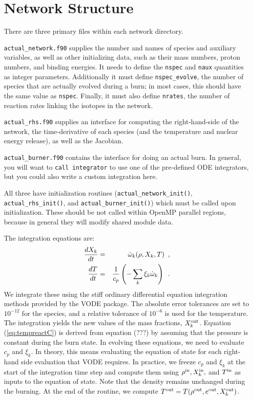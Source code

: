 \section{Network Structure}

There are three primary files within each network directory.

{\tt actual\_network.f90} supplies the number and names of species and
auxiliary variables, as well as other initializing data, such as their
mass numbers, proton numbers, and binding energies. It needs to define
the {\tt nspec} and {\tt naux} quantities as integer parameters. Additionally
it must define {\tt nspec\_evolve}, the number of species that are actually evolved
during a burn; in most cases, this should have the same value as {\tt nspec}.
Finally, it must also define {\tt nrates}, the number of reaction rates
linking the isotopes in the network.

{\tt actual\_rhs.f90} supplies an interface for computing the right-hand-side
of the network, the time-derivative of each species (and the temperature and
nuclear energy release), as well as the Jacobian.

{\tt actual\_burner.f90} contains the interface for doing an actual burn.
In general, you will want to {\tt call integrator} to use one of the pre-defined
ODE integrators, but you could also write a custom integration here.

All three have initialization routines ({\tt actual\_network\_init()},
{\tt actual\_rhs\_init()}, and {\tt actual\_burner\_init()}) which must
be called upon initialization. These should be not called within
OpenMP parallel regions, because in general they will modify shared module data.

The integration equations are:
\begin{eqnarray}
\frac{dX_k}{dt} &=& \dot{\omega}_k(\rho,X_k,T)\enskip, \label{eq:VODE1C} \\
\frac{dT}{dt} &=&\frac{1}{c_p} \left ( -\sum_k \xi_k  \dot{\omega}_k  \right )\enskip. \label{eq:tempreactC}
\end{eqnarray}
We integrate these using the stiff ordinary differential equation
integration methods provided by the VODE package.  The absolute error
tolerances are set to $10^{-12}$ for the species, and a relative
tolerance of $10^{-6}$ is used for the temperature.  The integration
yields the new values of the mass fractions, $X_k^{\mathrm{out}}$.  Equation
(\ref{eq:tempreactC}) is derived from equation (???) by assuming that
the pressure is constant during the burn state.  In evolving these
equations, we need to evaluate $c_p$ and $\xi_k$.  In theory, this
means evaluating the equation of state for each right-hand side
evaluation that VODE requires.  In practice, we freeze $c_p$ and
$\xi_k$ at the start of the integration time step and compute them
using $\rho^{\mathrm{in}}, X_k^{\mathrm{in}},$ and $T^{\mathrm{in}}$ as inputs to the equation of
state.  Note that the density remains unchanged during the burning.
At the end of the routine, we compute $T^{\mathrm{out}} =
T(\rho^{\mathrm{out}},e^{\mathrm{out}},X_k^{\mathrm{out}})$.

